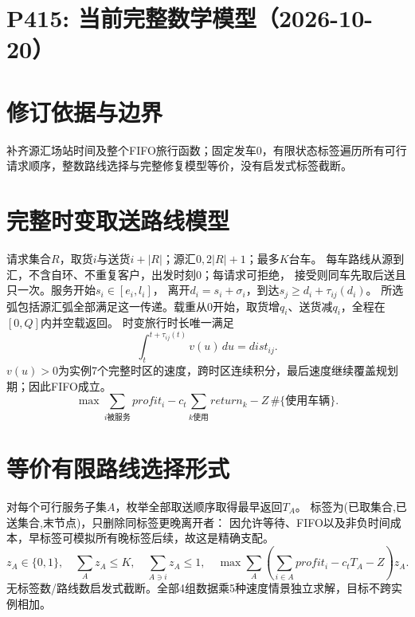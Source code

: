 \documentclass[11pt]{ctexart}
\begin{document}
\section*{P415: 当前完整数学模型（2026-10-20）}
\section*{修订依据与边界}补齐源汇场站时间及整个FIFO旅行函数；固定发车0，有限状态标签遍历所有可行请求顺序，整数路线选择与完整修复模型等价，没有启发式标签截断。

\section*{完整时变取送路线模型}
请求集合$R$，取货$i$与送货$i+|R|$；源汇$0,2|R|+1$；最多$K$台车。
每车路线从源到汇，不含自环、不重复客户，出发时刻0；每请求可拒绝，
接受则同车先取后送且只一次。服务开始$s_i\in[e_i,l_i]$，
离开$d_i=s_i+\sigma_i$，到达$s_j\ge d_i+\tau_{ij}(d_i)$。
所选弧包括源汇弧全部满足这一传递。载重从0开始，取货增$q_i$、送货减$q_i$，全程在$[0,Q]$内并空载返回。
时变旅行时长唯一满足
\[
\int_t^{t+\tau_{ij}(t)}v(u)\,du=dist_{ij}.
\]
$v(u)>0$为实例7个完整时区的速度，跨时区连续积分，最后速度继续覆盖规划期；因此FIFO成立。
\[
\max \sum_{i\text{被服务}}profit_i-c_t\sum_{k\text{使用}}return_k-Z\,\#\{\text{使用车辆}\}.
\]
\section*{等价有限路线选择形式}
对每个可行服务子集$A$，枚举全部取送顺序取得最早返回$T_A$。
标签为(已取集合,已送集合,末节点)，只删除同标签更晚离开者：
因允许等待、FIFO以及非负时间成本，早标签可模拟所有晚标签后续，故这是精确支配。
\[
z_A\in\{0,1\},\quad\sum_Az_A\le K,\quad\sum_{A\ni i}z_A\le1,\quad
\max\sum_A\left(\sum_{i\in A}profit_i-c_tT_A-Z\right)z_A.
\]
无标签数/路线数启发式截断。全部4组数据乘5种速度情景独立求解，目标不跨实例相加。
\end{document}
